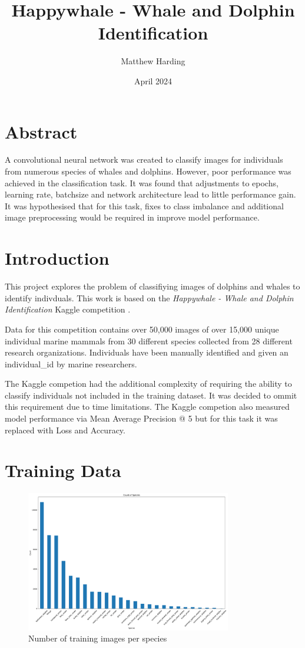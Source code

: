 \documentclass{article}
\title{Happywhale - Whale and Dolphin Identification}
\author{Matthew Harding}
\date{April 2024}
\begin{document}
\maketitle

\section{Abstract}
A convolutional neural network was created to classify images for individuals from numerous species of whales and dolphins. However, poor performance was achieved in the classification task.
It was found that adjustments to epochs, learning rate, batchsize and network architecture lead to little performance gain. It was hypothesised that for this task, fixes to class imbalance and additional image preprocessing would 
be required in improve model performance.

\section{Introduction}
This project explores the problem of classifiying images of dolphins and whales to identify indivduals. This work 
is based on the \emph{Happywhale - Whale and Dolphin Identification} Kaggle competition \cite{kaggle_comp}.

Data for this competition contains over 50,000 images of over 15,000 unique individual marine mammals from 30 different species collected from 28 different research organizations. 
Individuals have been manually identified and given an individual\_id by marine researchers.

The Kaggle competion had the additional complexity of requiring the ability to classify individuals not included in the training dataset. It was decided to ommit this requirement due to time limitations. The Kaggle competion also measured model performance via Mean Average Precision @ 5 but for this task it was replaced with Loss and Accuracy.

\section{Training Data}

\begin{figure}[!htb]
    \centering
    \includegraphics[width=0.8\textwidth]{species_histogram.png}
    \caption{Number of training images per species}
    \label{fig:species_count_histogram}
\end{figure}
\end{document}
